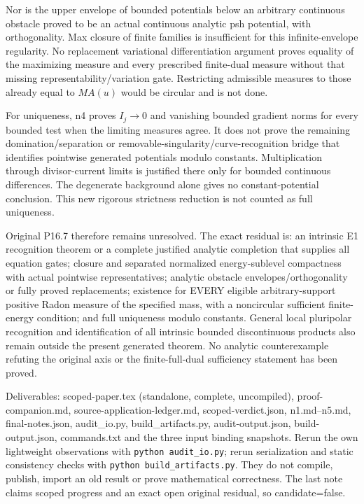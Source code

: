 \documentclass[11pt]{article}
\begin{document}
Nor is the upper envelope of bounded potentials below an arbitrary continuous obstacle proved to be an actual continuous analytic psh potential, with orthogonality. Max closure of finite families is insufficient for this infinite-envelope regularity. No replacement variational differentiation argument proves equality of the maximizing measure and every prescribed finite-dual measure without that missing representability/variation gate. Restricting admissible measures to those already equal to $MA(u)$ would be circular and is not done.

For uniqueness, n4 proves $I_j\to0$ and vanishing bounded gradient norms for every bounded test when the limiting measures agree. It does not prove the remaining domination/separation or removable-singularity/curve-recognition bridge that identifies pointwise generated potentials modulo constants. Multiplication through divisor-current limits is justified there only for bounded continuous differences. The degenerate background alone gives no constant-potential conclusion. This new rigorous strictness reduction is not counted as full uniqueness.

Original P16.7 therefore remains unresolved. The exact residual is: an intrinsic E1 recognition theorem or a complete justified analytic completion that supplies all equation gates; closure and separated normalized energy-sublevel compactness with actual pointwise representatives; analytic obstacle envelopes/orthogonality or fully proved replacements; existence for EVERY eligible arbitrary-support positive Radon measure of the specified mass, with a noncircular sufficient finite-energy condition; and full uniqueness modulo constants. General local pluripolar recognition and identification of all intrinsic bounded discontinuous products also remain outside the present generated theorem. No analytic counterexample refuting the original axis or the finite-full-dual sufficiency statement has been proved.

Deliverables: scoped-paper.tex (standalone, complete, uncompiled), proof-companion.md, source-application-ledger.md, scoped-verdict.json, n1.md--n5.md, final-notes.json, audit\_io.py, build\_artifacts.py, audit-output.json, build-output.json, commands.txt and the three input binding snapshots. Rerun the own lightweight observations with \texttt{python audit\_io.py}; rerun serialization and static consistency checks with \texttt{python build\_artifacts.py}. They do not compile, publish, import an old result or prove mathematical correctness. The last note claims scoped progress and an exact open original residual, so candidate=false.
\end{document}
